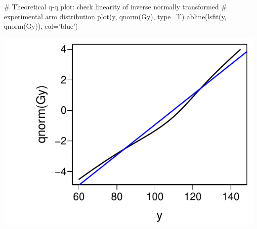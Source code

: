 \begin{Schunk}
\begin{Sinput}
# Theoretical q-q plot: check linearity of inverse normally transformed
# experimental arm distribution
plot(y, qnorm(Gy), type='l')
abline(lsfit(y, qnorm(Gy)), col='blue')
\end{Sinput}


\centerline{\includegraphics[width=\maxwidth]{nonpar-hownn2-1} }

\end{Schunk}

